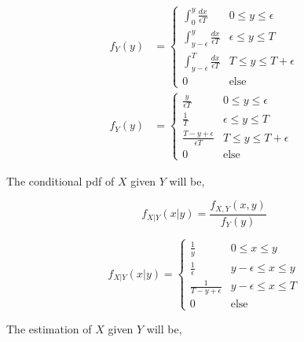 \documentclass{article}
\theoremstyle{mytheoremstyle}
\theoremstyle{mytheoremstyle}
\theoremstyle{myproblemstyle}
\begin{document}
\begin{equation}
    \begin{split}
        f_Y(y)&=\begin{cases}
            \displaystyle\int_{0}^{y}\frac{dx}{\epsilon T}          & 0\le y\le \epsilon   \\
            \displaystyle\int_{y-\epsilon}^{y}\frac{dx}{\epsilon T} & \epsilon\le y\le T   \\
            \displaystyle\int_{y-\epsilon}^{T}\frac{dx}{\epsilon T} & T\le y\le T+\epsilon \\
            0                                                       & \text{else}
        \end{cases}\\
        f_Y(y)&=\begin{cases}
            \displaystyle\frac{y}{\epsilon T}            & 0\le y\le \epsilon   \\
            \displaystyle\frac{1}{T}                     & \epsilon\le y\le T   \\
            \displaystyle\frac{T-y+\epsilon}{\epsilon T} & T\le y\le T+\epsilon \\
            0                                            & \text{else}
        \end{cases}
    \end{split}
\end{equation}

The conditional pdf of \(X\) given \(Y\) will be,

\[f_{X|Y}(x|y)=\frac{f_{X,Y}(x,y)}{f_{Y}(y)}\]

\begin{equation*}
    f_{X|Y}(x|y)=\begin{cases}
        \displaystyle\frac{1}{y}            & 0\le x\le y          \\
        \displaystyle\frac{1}{\epsilon}     & y-\epsilon\le x\le y \\
        \displaystyle\frac{1}{T-y+\epsilon} & y-\epsilon\le x\le T \\
        0                                   & \text{else}
    \end{cases}
\end{equation*}

The estimation of \(X\) given \(Y\) will be,
\end{document}
